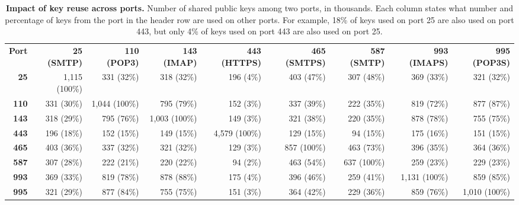\begin{table*}[th]
\centering\footnotesize
 \begin{tabular}{rrrrrrrrr} 
\toprule

\textbf{Port} & \textbf{25 (SMTP)} & \textbf{110 (POP3)} & \textbf{143 (IMAP)} & \textbf{443 (HTTPS)} & \textbf{465 (SMTPS)} & \textbf{587 (SMTP)} & \textbf{993 (IMAPS)} & \textbf{995 (POP3S)}\smallskip\\
\textbf{ 25} &  1,115 (100\%) &          331 (32\%) &       318 (32\%) &       196 (4\%) &        403 (47\%) &       307 (48\%) &       369 (33\%) &       321 (32\%) \\
\textbf{110} &    331 (30\%) &         1,044 (100\%) &      795 (79\%) &       152 (3\%) &        337 (39\%) &       222 (35\%) &       819 (72\%) &       877 (87\%) \\
\textbf{143} &    318 (29\%) &           795 (76\%) &     1,003 (100\%) &      149 (3\%) &        321 (38\%) &       220 (35\%) &       878 (78\%) &       755 (75\%) \\
\textbf{443} &    196 (18\%) &           152 (15\%) &       149 (15\%) &     4,579 (100\%) &      129 (15\%) &        94 (15\%) &       175 (16\%) &       151 (15\%) \\
\textbf{465} &    403 (36\%) &           337 (32\%) &       321 (32\%) &       129 (3\%) &        857 (100\%) &      463 (73\%) &       396 (35\%) &       364 (36\%) \\
\textbf{587} &    307 (28\%) &           222 (21\%) &       220 (22\%) &        94 (2\%) &        463 (54\%) &       637 (100\%) &      259 (23\%) &       229 (23\%) \\
\textbf{993} &    369 (33\%) &           819 (78\%) &       878 (88\%) &       175 (4\%) &        396 (46\%) &       259 (41\%) &     1,131 (100\%) &      859 (85\%) \\
\textbf{995} &    321 (29\%) &           877 (84\%) &       755 (75\%) &       151 (3\%) &        364 (42\%) &       229 (36\%) &       859 (76\%) &     1,010 (100\%) \\

\bottomrule
 \end{tabular}
 \caption{\textbf{Impact of key reuse across ports.} Number of shared public keys among two ports, in thousands.
          Each column states what number and percentage of keys from the port in the header row are used on other ports.
          For example, 18\% of keys used on port 25 are also used on port 443, but only 4\% of keys used on port 443 are also used on port 25. }
 \label{amount_shared_keys}
\end{table*}

